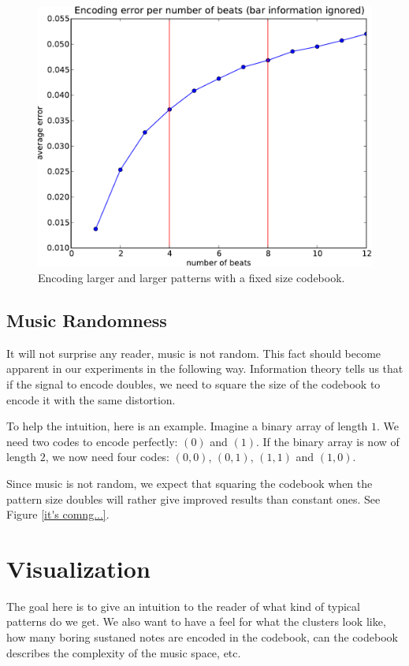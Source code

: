 \documentclass{article}
\begin{document}
\begin{figure}[htb]
\begin{center}
\includegraphics[width=.9\columnwidth]{encoding_per_beat}
\end{center}
\caption{\small{Encoding larger and larger patterns with a fixed size
codebook.}}
\label{fig:perbeat}
\end{figure}

\subsection{Music Randomness}
It will not surprise any reader, music is not random. This fact should
become apparent in our experiments in the following way. Information
theory tells us that if the signal to encode doubles, we need to square
the size of the codebook to encode it with the same distortion.

To help the intuition, here is an example. Imagine a binary array of 
length $1$. We need two
codes to encode perfectly: $(0)$ and $(1)$. If the binary array is now of
length $2$, we now need four codes: $(0,0)$, $(0,1)$, $(1,1)$ and $(1,0)$.

Since music is not random, we expect that squaring the codebook when the
pattern size doubles will rather give improved results than constant ones.
See Figure \ref{it's comng...}.


\section{Visualization}
The goal here is to give an intuition to the reader of what kind of
typical patterns do we get. We also want to have a feel for what the
clusters look like, how many boring sustaned notes are encoded in the
codebook, can the codebook describes the complexity of the music space, etc.
\end{document}
